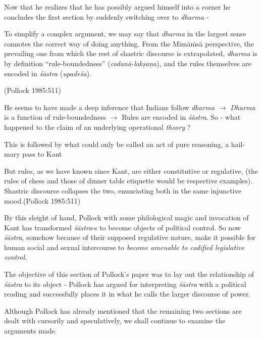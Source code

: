 Now that he realizes that he has possibly argued himself into a corner he concludes the first section by suddenly switching over to {\sl dharma} -
\begin{myquote}
To simplify a complex argument, we may say that {\sl dharma} in the largest sense connotes the correct way of doing anything. From the Mīmāṁsā perspective, the prevailing one from which the rest of shastric discourse is extrapolated, {\sl dharma} is by definition ``rule-boundedness'' ({\sl codanā-lakṣaṇa}), and the rules themselves are encoded in {\sl śāstra} ({\sl upadeśa}).

\hfill (Pollock 1985:511)
\end{myquote}

He seems to have made a deep inference that Indians follow {\sl dharma} $\to$ {\sl Dharma} is a function of rule-boundedness $\to$ Rules are encoded in {\sl śāstra}. So - what happened to the claim of an underlying operational {\sl theory} ?

This is followed by what could only be called an act of pure reasoning, a hail-mary pass to Kant
\begin{myquote}
But rules, as we have known since Kant, are either constitutive or regulative, (the rules of chess and those of dinner table etiquette would be respective examples). Shastric discourse collapses the two, enunciating both in the same injunctive mood.\hfill (Pollock 1985:511)
\end{myquote}

By this sleight of hand, Pollock with some philological magic and invocation of Kant has transformed {\sl śāstra}-s to become objects of political control. So now {\sl śāstra}, somehow because of their supposed regulative nature, make it possible for human social and sexual intercourse to {\sl become amenable to codified legislative control}.

The objective of this section of Pollock's paper was to lay out the relationship of {\sl śāstra} to its object - Pollock has argued for interpreting {\sl śāstra} with a political reading and successfully places it in what he calls the larger discourse of power.

Although Pollock has already mentioned that the remaining two sections are dealt with cursorily and speculatively, we shall continue to examine the arguments made.

